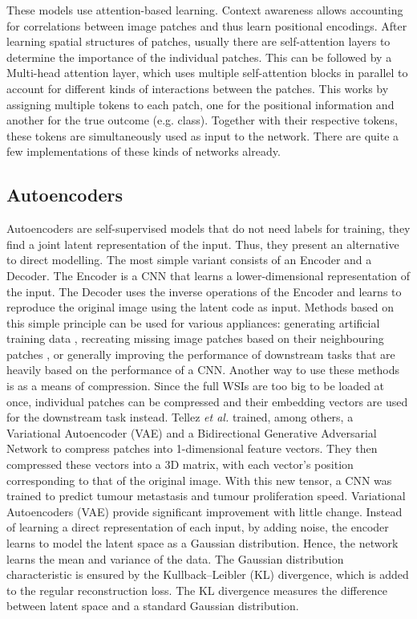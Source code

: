 These models use attention-based learning. Context awareness allows accounting for correlations between image patches and thus learn positional encodings. After learning spatial structures of patches, usually there are self-attention layers to determine the importance of the individual patches. This can be followed by a Multi-head attention layer, which uses multiple self-attention blocks in parallel to account for different kinds of interactions between the patches.
This works by assigning multiple tokens to each patch, one for the positional information and another for the true outcome (e.g. class). Together with their respective tokens, these tokens are simultaneously used as input to the network. \cite{Lipkova2022Artificial} There are quite a few implementations of these kinds of networks already. \cite{Chen2022Scaling, Chen2021Multimodal, Dosovitskiy2020Image}

\subsection{Autoencoders}

Autoencoders are self-supervised models that do not need labels for training, they find a joint latent representation of the input. Thus, they present an alternative to direct modelling. \cite{Stahlschmidt2022Multimodal} The most simple variant consists of an Encoder and a Decoder. The Encoder is a CNN that learns a lower-dimensional representation of the input. The Decoder uses the inverse operations of the Encoder and learns to reproduce the original image using the latent code as input. Methods based on this simple principle can be used for various appliances: generating artificial training data \cite{Chen2022Fast}, recreating missing image patches based on their neighbouring patches \cite{Lipkova2022Artificial}, or generally improving the performance of downstream tasks that are heavily based on the performance of a CNN. 
Another way to use these methods is as a means of compression. Since the full WSIs are too big to be loaded at once, individual patches can be compressed and their embedding vectors are used for the downstream task instead. Tellez \textit{et al.} trained, among others, a Variational Autoencoder (VAE) and a Bidirectional Generative Adversarial Network to compress patches into 1-dimensional feature vectors. They then compressed these vectors into a 3D matrix, with each vector's position corresponding to that of the original image. With this new tensor, a CNN was trained to predict tumour metastasis and tumour proliferation speed. \cite{Tellez2019Neural}
Variational Autoencoders (VAE) provide significant improvement with little change. Instead of learning a direct representation of each input, by adding noise, the encoder learns to model the latent space as a Gaussian distribution. Hence, the network learns the mean and variance of the data. The Gaussian distribution characteristic is ensured by the Kullback–Leibler (KL) divergence, which is added to the regular reconstruction loss. The KL divergence measures the difference between latent space and a standard Gaussian distribution. \cite{Kingma2019Introduction}

